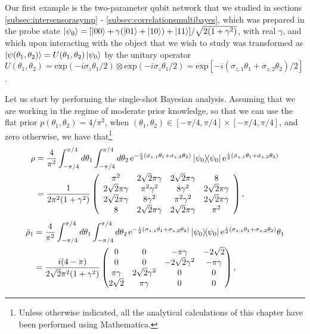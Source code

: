 Our first example is the two-parameter qubit network that we studied in sections \ref{subsec:intersensorasymp} - \ref{subsec:correlationsmultibayes}, which was prepared in the probe state $\ket{\psi_0} = [\ket{00}+\gamma (\ket{01}+\ket{10})+\ket{11}]/\sqrt{2(1+\gamma^2)}$, with real $\gamma$, and which upon interacting with the object that we wish to study was transformed as $\ket{\psi(\theta_1, \theta_2)} = U(\theta_1, \theta_2) \ket{\psi_0}$ by the unitary operator $U(\theta_1, \theta_2) = \mathrm{exp}(-i\sigma_z\theta_1/2)\otimes \mathrm{exp}(-i\sigma_z\theta_1/2) = \mathrm{exp}[-i(\sigma_{z,1}\theta_1 + \sigma_{z,2}\theta_2)/2]$. 

Let us start by performing the single-shot Bayesian analysis. Assuming that we are working in the regime of moderate prior knowledge, so that we can use the flat prior $p(\theta_1, \theta_2) = 4/\pi^2$, when $(\theta_1, \theta_2) \in [-\pi/4, \pi/4]\times[-\pi/4, \pi/4]$, and zero otherwise, we have that\footnote{Unless otherwise indicated, all the analytical calculations of this chapter have been performed using Mathematica.}
\begin{align}
\rho &= \frac{4}{\pi^2}\int_{-\pi/4}^{\pi/4} d\theta_1 \int_{-\pi/4}^{\pi/4} d\theta_2\hspace{0.15em} \mathrm{e}^{-\frac{i}{2}(\sigma_{z,1}\theta_1 + \sigma_{z,2}\theta_2)}\ketbra{\psi_0}\mathrm{e}^{\frac{i}{2}(\sigma_{z,1}\theta_1 + \sigma_{z,2}\theta_2)}
\nonumber \\
&= \frac{1}{2\pi^2(1+\gamma^2)}
\left(
\begin{array}{cccc}
 \pi ^2 & 2 \sqrt{2} \pi  \gamma  & 2 \sqrt{2} \pi  \gamma  & 8 \\
 2 \sqrt{2} \pi  \gamma  & \pi ^2 \gamma ^2 & 8 \gamma ^2 & 2 \sqrt{2} \pi  \gamma  \\
 2 \sqrt{2} \pi  \gamma  & 8 \gamma ^2 & \pi ^2 \gamma ^2 & 2 \sqrt{2} \pi  \gamma  \\
 8 & 2 \sqrt{2} \pi  \gamma  & 2 \sqrt{2} \pi  \gamma  & \pi ^2 \\
\end{array}
\right),
\label{labeleffstate}
\end{align}
\begin{align}
\bar{\rho}_1 &= \frac{4}{\pi^2}\int_{-\pi/4}^{\pi/4} d\theta_1 \int_{-\pi/4}^{\pi/4} d\theta_2\hspace{0.15em} \mathrm{e}^{-\frac{i}{2}(\sigma_{z,1}\theta_1 + \sigma_{z,2}\theta_2)}\ketbra{\psi_0}\mathrm{e}^{\frac{i}{2}(\sigma_{z,1}\theta_1 + \sigma_{z,2}\theta_2)}\theta_1
\nonumber \\
&= \frac{i(4-\pi)}{2\sqrt{2}\pi^2(1+\gamma^2)}
\begin{pmatrix}
0 & 0 & -\pi\gamma & -2\sqrt{2} \\
0 & 0 & -2\sqrt{2}\gamma^2 & -\pi\gamma \\
\pi\gamma & 2\sqrt{2}\gamma^2 & 0 & 0 \\
2\sqrt{2} & \pi\gamma & 0 & 0 
\end{pmatrix},
\label{labeleffmean1}
\end{align}
